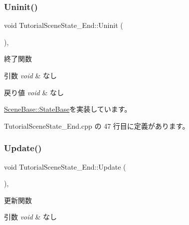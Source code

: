\subsubsection{\texorpdfstring{Uninit()}{Uninit()}}
{\footnotesize\ttfamily void Tutorial\+Scene\+State\+\_\+\+End\+::\+Uninit (\begin{DoxyParamCaption}{ }\end{DoxyParamCaption})\hspace{0.3cm}{\ttfamily [override]}, {\ttfamily [virtual]}}



終了関数 


\begin{DoxyParams}{引数}
{\em void} & なし \\
\hline
\end{DoxyParams}

\begin{DoxyRetVals}{戻り値}
{\em void} & なし \\
\hline
\end{DoxyRetVals}


\mbox{\hyperlink{class_scene_base_1_1_state_base_a2763fa37e45b39bd8d3bbb735c76c59b}{Scene\+Base\+::\+State\+Base}}を実装しています。



 Tutorial\+Scene\+State\+\_\+\+End.\+cpp の 47 行目に定義があります。

\mbox{\label{class_tutorial_scene_state___end_a7cdf03fa9a0e41ab86c2b41b8165ad09}} 
\subsubsection{\texorpdfstring{Update()}{Update()}}
{\footnotesize\ttfamily void Tutorial\+Scene\+State\+\_\+\+End\+::\+Update (\begin{DoxyParamCaption}{ }\end{DoxyParamCaption})\hspace{0.3cm}{\ttfamily [override]}, {\ttfamily [virtual]}}



更新関数 


\begin{DoxyParams}{引数}
{\em void} & なし \\
\hline
\end{DoxyParams}

